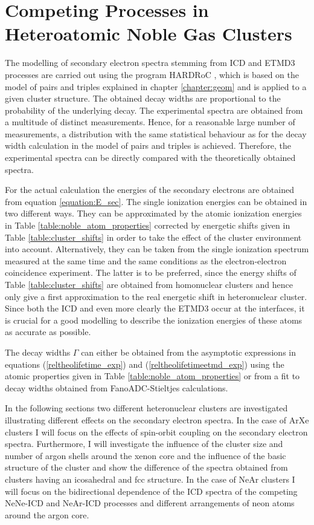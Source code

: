 \chapter[Heteroatomic Noble Gas Clusters]{Competing Processes in Heteroatomic Noble Gas Clusters}
\label{chapter_clusters}

The modelling of secondary electron spectra stemming from \ac{ICD}
and \ac{ETMD}3 processes are carried out using the program
HARDRoC \cite{HARDRoC}, which is based on the model of pairs and
triples explained in chapter \ref{chapter:geom} and is applied
to a given cluster structure. The obtained
decay widths are proportional to the probability of the underlying decay.
The experimental spectra are obtained from a multitude of distinct measurements.
Hence, for a reasonable large number of measurements, a distribution with the
same statistical behaviour as for the decay width calculation in the
model of pairs and triples is achieved. Therefore, the experimental spectra
can be directly compared with the theoretically obtained spectra.

For the actual calculation the energies of the secondary electrons are obtained
from equation \ref{equation:E_sec}. The single ionization energies
can be obtained in two different ways. They can be
approximated by the atomic ionization energies in Table
\ref{table:noble_atom_properties} corrected by energetic shifts
given in Table \ref{table:cluster_shifts} in order to take
the effect of the cluster environment into account. 
Alternatively, they can be taken from the single ionization spectrum
measured at the same time and the same conditions as the electron-electron
coincidence experiment. The latter is to be preferred, since the energy shifts
of Table \ref{table:cluster_shifts} are obtained from homonuclear clusters and
hence only give a first approximation to the real energetic shift in
heteronuclear cluster. Since both the \ac{ICD} and even more clearly the
\ac{ETMD}3 occur at the interfaces, it is crucial for a good modelling to
describe the ionization energies of these atoms as accurate as possible.

The decay widths $\Gamma$ can either be obtained from the asymptotic expressions
in equations (\ref{reltheolifetime_exp}) and (\ref{reltheolifetimeetmd_exp})
using the atomic properties given in Table \ref{table:noble_atom_properties}
or from a fit to decay widths obtained from FanoADC-Stieltjes calculations.

In the following sections two different heteronuclear clusters are investigated
illustrating different effects on the secondary electron spectra.
In the case of ArXe clusters I will focus on the effects of spin-orbit coupling
on the secondary electron spectra. Furthermore, I will investigate the influence
of the cluster size and number of argon shells around the xenon core and
the influence of the basic structure of the cluster and show the
difference of the spectra
obtained from clusters having an icosahedral
and \ac{fcc} structure.
In the case of NeAr clusters I will focus on the bidirectional dependence of
the ICD spectra of the competing NeNe-ICD and NeAr-ICD processes and
different arrangements of neon atoms around the argon core.

\newpage

\newpage



